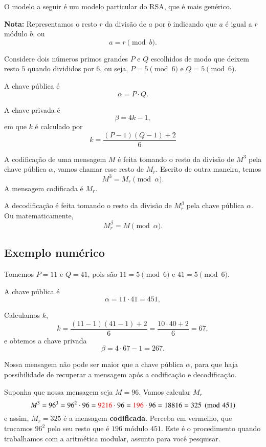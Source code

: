 \documentclass[a4paper, 12pt]{article} %
\begin{document}
O modelo a seguir é um modelo particular do RSA, que é mais genérico.

{
\color{ForestGreen} \textbf{Nota:} Representamos o resto $r$ da divisão de $a$ por $b$ indicando que $a$ é igual a $r$ módulo $b$, ou 
\[
  a = r \pmod{b}.
\]
}

Considere dois números primos grandes $P$ e $Q$ escolhidos de modo que deixem resto $5$ quando divididos por $6$, ou seja, $P=5\pmod{6}$ e $Q=5\pmod{6}$.

A chave pública é
\begin{equation} \label{eq:chavePublica}
\alpha = P \cdot Q.
\end{equation}

A chave privada é 
\begin{equation} %
  \label{eq:chavePrivada} %
\beta = 4 k - 1, 
\end{equation}
em que $k$ é calculado por
\[
 k = \frac{(P-1)(Q-1) + 2}{6} %
\]


A codificação de uma mensagem $M$ é feita tomando o resto da divisão de $M^3$ pela chave pública $\alpha$, vamos chamar esse resto de $M_r$. Escrito de outra maneira, temos
\[
M^3 = M_r\pmod{\alpha}.
\]
A mensagem codificada é $M_r$.


A decodificação é feita tomando o resto da divisão de $M_r^{\beta}$ pela chave pública $\alpha$. Ou matematicamente,
\[
M_r^\beta = M \pmod{\alpha}.
\]




\subsection{Exemplo numérico}
Tomemos $P=11$ e $Q=41$, pois são $11 = 5 \pmod{6}$ e $41 = 5 \pmod{6}$.

A chave pública é 
\[ %
  \alpha = 11\cdot 41 = 451,
\]

Calculamos $k$,
\[
  k = \frac{(11-1)(41-1) + 2}{6} = \frac{10\cdot 40 + 2}{6} = 67,
\]
e obtemos a chave privada
\[
\beta = 4\cdot 67 - 1 = 267.  
\]

Nossa mensagem não pode ser maior que a chave pública $\alpha$, para que haja possibilidade de recuperar a mensagem após a codificação e decodificação.

Suponha que nossa mensagem seja $M = 96$. Vamos calcular $M_r$
\[
 M^3 = 96^3 = 96^2 \cdot 96 = {\color{red}9216} \cdot 96 = {\color{red}196} \cdot 96 = 18816 = 325\pmod{451}
\]
e assim, $M_r=325$ é a mensagem \textbf{\color{ForestGreen}codificada}. Perceba em vermelho, que trocamos $96^2$ pelo seu resto que é $196$ módulo $451$. Este é o procedimento quando trabalhamos com a aritmética modular, assunto para você pesquisar.
\end{document}
